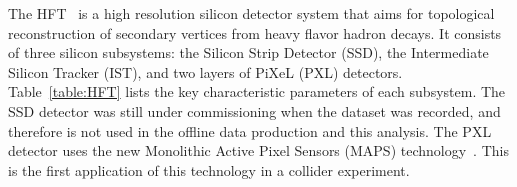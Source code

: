\documentclass[%
 reprint,	
showpacs,
 amsmath,amssymb,
 aps,
 prc,
]{revtex4-1}
\begin{document}
The HFT~\cite{Contin:2017mck} is a high resolution silicon detector system that aims for topological reconstruction of secondary vertices from heavy flavor hadron decays. It consists of three silicon subsystems: the Silicon Strip Detector (SSD), the Intermediate Silicon Tracker (IST), and two layers of PiXeL (PXL) detectors. 
Table~\ref{table:HFT} lists the key characteristic parameters of each subsystem. The SSD detector was still under commissioning when the dataset was recorded, and therefore is not used in the offline data production and this analysis.
The PXL detector uses the new Monolithic Active Pixel Sensors (MAPS) technology~\cite{Contin:2017mck}. This is the first application of this technology in a collider experiment. %

\begin{table}[t]
\end{table}
\end{document}
